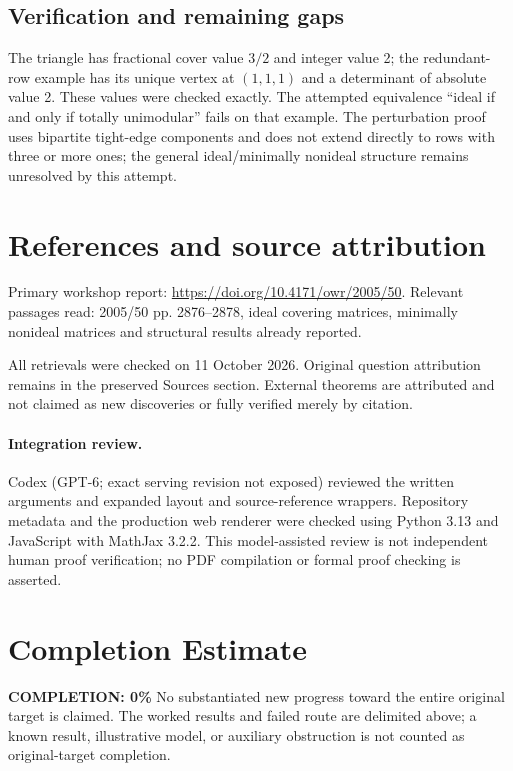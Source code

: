 \documentclass[11pt]{article}
\begin{document}
\subsection{Verification and remaining gaps}
The triangle has fractional cover value $3/2$ and integer value 2; the redundant-row example has its unique vertex at $(1,1,1)$ and a determinant of absolute value 2. These values were checked exactly. The attempted equivalence ``ideal if and only if totally unimodular'' fails on that example. The perturbation proof uses bipartite tight-edge components and does not extend directly to rows with three or more ones; the general ideal/minimally nonideal structure remains unresolved by this attempt.

\section{References and source attribution}
Primary workshop report: \url{https://doi.org/10.4171/owr/2005/50}. Relevant passages read: 2005/50 pp. 2876--2878, ideal covering matrices, minimally nonideal matrices and structural results already reported.

All retrievals were checked on 11 October 2026. Original question attribution remains in the preserved Sources section. External theorems are attributed and not claimed as new discoveries or fully verified merely by citation.


\paragraph{Integration review.} Codex (GPT-6; exact serving revision not exposed) reviewed the written arguments and expanded layout and source-reference wrappers. Repository metadata and the production web renderer were checked using Python 3.13 and JavaScript with MathJax 3.2.2. This model-assisted review is not independent human proof verification; no PDF compilation or formal proof checking is asserted.

\section{Completion Estimate}
\noindent\textbf{COMPLETION: 0\%}
No substantiated new progress toward the entire original target is claimed. The worked results and failed route are delimited above; a known result, illustrative model, or auxiliary obstruction is not counted as original-target completion.
\end{document}
